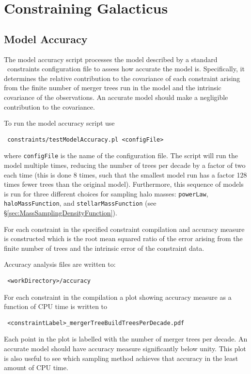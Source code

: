 \chapter{Constraining {\sc Galacticus}}

\section{Model Accuracy}\label{sec:ModelAccuracy}

The model accuracy script processes the model described by a standard \glc\ constraints configuration file to assess how accurate the model is. Specifically, it determines the relative contribution to the covariance of each constraint arising from the finite number of merger trees run in the model and the intrinsic covariance of the observations. An accurate model should make a negligible contribution to the covariance.

To run the model accuracy script use
\begin{verbatim}
 constraints/testModelAccuracy.pl <configFile>
\end{verbatim}
where {\tt configFile} is the name of the configuration file. The script will run the model multiple times, reducing the number of trees per decade by a factor of two each time (this is done 8 times, such that the smallest model run has a factor 128 times fewer trees than the original model). Furthermore, this sequence of models is run for three different choices for sampling halo masses: {\tt powerLaw}, {\tt haloMassFunction}, and {\tt stellarMassFunction} (see \S\ref{sec:MassSamplingDensityFunction}).

For each constraint in the specified constraint compilation and accuracy measure is constructed which is the root mean squared ratio of the error arising from the finite number of trees and the intrinsic error of the constraint data. 

Accuracy analysis files are written to:
\begin{verbatim}
 <workDirectory>/accuracy
\end{verbatim}
For each constraint in the compilation a plot showing accuracy measure as a function of CPU time is written to
\begin{verbatim}
 <constraintLabel>_mergerTreeBuildTreesPerDecade.pdf
\end{verbatim}
Each point in the plot is labelled with the number of merger trees per decade. An accurate model should have accuracy measure significantly below unity. This plot is also useful to see which sampling method achieves that accuracy in the least amount of CPU time.

